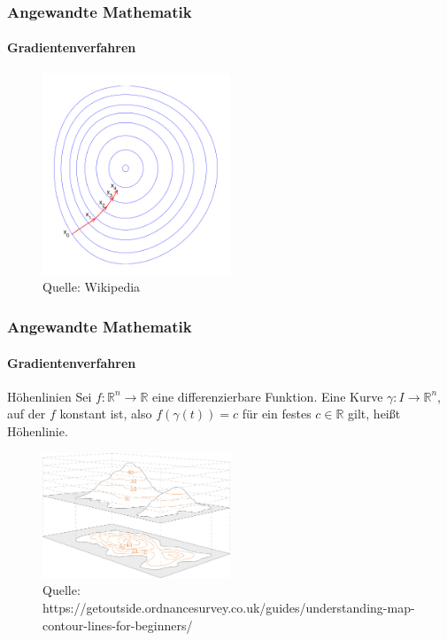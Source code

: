 \documentclass{beamer}
\begin{document}
\begin{frame}
    \frametitle{Angewandte Mathematik}
\framesubtitle{Gradientenverfahren}
\begin{figure}[H]
      \centering
    \includegraphics[width=0.5\textwidth]{images/Gradient_descent}
      \caption{Quelle: Wikipedia}
\end{figure}

 \end{frame}





 \begin{frame}
    \frametitle{Angewandte Mathematik}
\framesubtitle{Gradientenverfahren}
    \begin{block}{Höhenlinien}
Sei  $f: \mathbb{R}^n \to \mathbb{R}$  eine differenzierbare Funktion. Eine Kurve $\gamma : I \to \mathbb{R}^n$, auf der $f$ konstant ist, also 
$f(\gamma(t)) = c$ für ein festes $c \in \mathbb{R}$ gilt, heißt Höhenlinie.
\end{block}

\begin{figure}[H]
      \centering
    \includegraphics[width=0.5\textwidth]{images/Contours-and-relief}
      \caption{Quelle: https://getoutside.ordnancesurvey.co.uk/guides/understanding-map-contour-lines-for-beginners/}
\end{figure}

 \end{frame}
\end{document}
